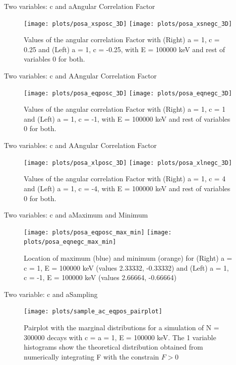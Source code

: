 \documentclass{beamer}
\begin{document}
\begin{frame}{Two variables: c and a}{Angular Correlation Factor}
	\begin{figure}
		\centering
		\texttt{[image: plots/posa\_xsposc\_3D]}
		\texttt{[image: plots/posa\_xsnegc\_3D]}
		\caption{Values of the angular correlation Factor with (Right) a = 1, c = 0.25 and (Left) a = 1, c = -0.25, with E = 100000 keV and rest of variables 0 for both.}
	\end{figure}
\end{frame}
\begin{frame}{Two variables: c and A}{Angular Correlation Factor}
	\begin{figure}
		\centering
		\texttt{[image: plots/posa\_eqposc\_3D]}
		\texttt{[image: plots/posa\_eqnegc\_3D]}
		\caption{Values of the angular correlation Factor with (Right) a = 1, c = 1 and (Left) a = 1, c = -1, with E = 100000 keV and rest of variables 0 for both.}
	\end{figure}
\end{frame}
\begin{frame}{Two variables: c and A}{Angular Correlation Factor}
	\begin{figure}
		\centering
		\texttt{[image: plots/posa\_xlposc\_3D]}
		\texttt{[image: plots/posa\_xlnegc\_3D]}
		\caption{Values of the angular correlation Factor with (Right) a = 1, c = 4 and (Left) a = 1, c = -4, with E = 100000 keV and rest of variables 0 for both.}
		
	\end{figure}
\end{frame}
\begin{frame}{Two variables: c and a}{Maximum and Minimum}
	\begin{figure}
		\centering
		\texttt{[image: plots/posa\_eqposc\_max\_min]}
		\texttt{[image: plots/posa\_eqnegc\_max\_min]}
		\caption{Location of maximum (blue) and minimum (orange) for (Right) a = c = 1, E = 100000 keV (values 2.33332, -0.33332) and (Left) a = 1, c = -1, E = 100000 keV (values 2.66664, -0.66664)}
	\end{figure}
\end{frame}
\begin{frame}{Two variable: c and a}{Sampling}
	\begin{figure}
		\centering
		\texttt{[image: plots/sample\_ac\_eqpos\_pairplot]}
		\caption{Pairplot with the marginal distributions for a simulation of N = 300000 decays with c = a = 1, E = 100000 keV. The 1 variable histograms show the theoretical distribution obtained from numerically integrating F with the constrain $F > 0$}
	\end{figure}
\end{frame}
\end{document}
